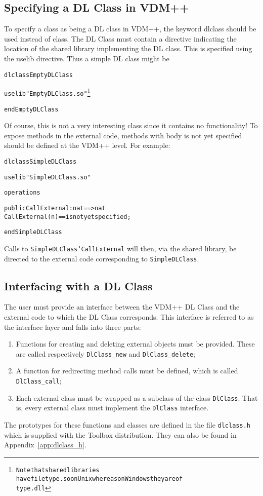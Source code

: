 \documentclass[\pformat,12pt]{article}
\begin{document}
\subsection{Specifying a DL Class in VDM++}

To specify a class as being a DL class in VDM++, the keyword
\textsf{dlclass} should be used instead of \textsf{class}. The DL
Class must contain a directive indicating the location of the
shared library implementing the DL class. This is specified using the
\textsf{uselib} directive. Thus a simple DL class might be

\begin{alltt}
\textsf{dlclass} EmptyDLClass

\textsf{uselib} "EmptyDLClass.so"\footnote{Note that shared libraries
  have file type \texttt{.so} on Unix whereas on Windows they are of
  type \texttt{.dll}} 

\textsf{end} EmptyDLClass
\end{alltt}

Of course, this is not a very interesting class since it contains no
functionality! To expose methods in the external code, methods with
body \textsf{is not yet specified} should be defined at the VDM++
level. For example:

\begin{alltt}
\textsf{dlclass} SimpleDLClass

\textsf{uselib} "SimpleDLClass.so"

\textsf{operations}

\textsf{public} CallExternal : nat ==> nat
CallExternal (n) == \textsf{is not yet specified};

\textsf{end} SimpleDLClass
\end{alltt}
Calls to \texttt{SimpleDLClass`CallExternal} will then, via the shared
library, be directed to the external code corresponding to
\texttt{SimpleDLClass}. 

\subsection{Interfacing with a DL Class}

The user must provide an interface between the VDM++ DL Class and the
external code to which the DL Class corresponds. This interface is
referred to as the interface layer and falls into three parts:
\begin{enumerate}
\item Functions for creating and deleting external objects must be
provided. These are called respectively \texttt{DlClass\_new} and
\texttt{DlClass\_delete}; 
\item A function for redirecting method calls must be defined, which
  is called \texttt{DlClass\_call};
\item Each external class must be wrapped as a subclass of the class
\texttt{DlClass}. That is, every external class must implement the
\texttt{DlClass} interface.
\end{enumerate}
The prototypes for these functions and classes are defined in the file
\texttt{dlclass.h} which is supplied with the Toolbox
distribution. They can also be found in Appendix~\ref{app:dlclass_h}.  
\end{document}

